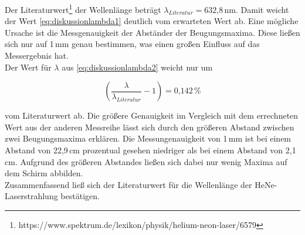 Der Literaturwert\footnote{https://www.spektrum.de/lexikon/physik/helium-neon-laser/6579} der Wellenlänge beträgt $\lambda_{Literatur} = \text{632,8}$\,nm. Damit weicht der Wert \ref{eq:diskussionlambda1} deutlich vom erwarteten Wert ab. Eine mögliche Ursache ist die Messgenauigkeit der Abständer der Beugungsmaxima. Diese ließen sich nur auf 1\,mm genau bestimmen, was einen großen Einfluss auf das Messergebnis hat.\\
Der Wert für $\lambda$ aus \ref{eq:diskussionlambda2} weicht nur um 

\begin{equation}
(\frac{\lambda}{\lambda_{Literatur}}-1)= \text{0,142}\,\%
\end{equation}

vom Literaturwert ab. Die größere Genauigkeit im Vergleich mit dem errechneten Wert aus der anderen Messreihe lässt sich durch den größeren Abstand zwischen zwei Beugungsmaxima erklären. Die Messungenauigkeit von 1\,mm ist bei einem Abstand von 22,9\,cm prozentual gesehen niedriger als bei einem Abstand von 2,1\,cm. Aufgrund des größeren Abstandes ließen sich dabei nur wenig Maxima auf dem Schirm abbilden.\\
Zusammenfassend ließ sich der Literaturwert für die Wellenlänge der HeNe-Laserstrahlung bestätigen.




























































